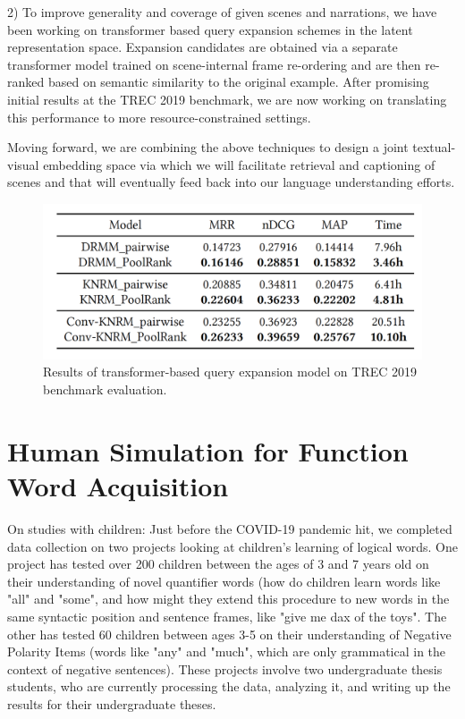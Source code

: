 \documentclass[11pt]{article}
\begin{document}
2) To improve generality and coverage of given scenes and narrations, we have been working on transformer based query expansion schemes in the latent representation space. Expansion candidates are obtained via a separate transformer model trained on scene-internal frame re-ordering and are then re-ranked based on semantic similarity to the original example. After promising initial results at the TREC 2019 benchmark, we are now working on translating this performance to more resource-constrained settings.

Moving forward, we are combining the above techniques to design a joint textual-visual embedding space via which we will facilitate retrieval and captioning of scenes and that will eventually feed back into our language understanding efforts. 

\begin{figure}[ht!]
\centering
\includegraphics[width=.6\linewidth]{figures/ir-table}
\caption{Results of transformer-based query expansion model on TREC 2019 benchmark evaluation.}
\end{figure}


\section{Human Simulation for Function Word Acquisition} 
\label{sec:hsr}

On studies with children: Just before the COVID-19 pandemic hit, we completed data collection on two projects looking at children's learning of logical words. One project has tested over 200 children between the ages of 3 and 7 years old on their understanding of novel quantifier words (how do children learn words like "all" and "some", and how might they extend this procedure to new words in the same syntactic position and sentence frames, like "give me dax of the toys". The other has tested 60 children between ages 3-5 on their understanding of Negative Polarity Items (words like "any" and "much", which are only grammatical in the context of negative sentences). These projects involve two undergraduate thesis students, who are currently processing the data, analyzing it, and writing up the results for their undergraduate theses.
\end{document}
